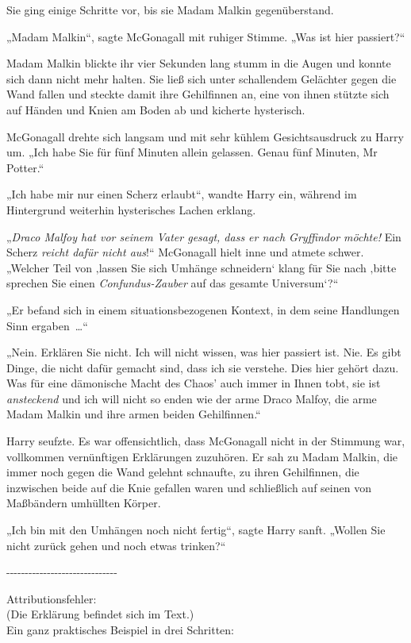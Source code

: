 {Sie ging einige Schritte vor, bis sie Madam Malkin gegenüberstand.

„Madam Malkin“, sagte McGonagall mit ruhiger Stimme. „Was ist hier passiert?“

Madam Malkin blickte ihr vier Sekunden lang stumm in die Augen und konnte sich dann nicht mehr halten. Sie ließ sich unter schallendem Gelächter gegen die Wand fallen und steckte damit ihre Gehilfinnen an, eine von ihnen stützte sich auf Händen und Knien am Boden ab und kicherte hysterisch.

McGonagall drehte sich langsam und mit sehr kühlem Gesichtsausdruck zu Harry um. „Ich habe Sie für fünf Minuten allein gelassen. Genau fünf Minuten, Mr Potter.“

„Ich habe mir nur einen Scherz erlaubt“, wandte Harry ein, während im Hintergrund weiterhin hysterisches Lachen erklang.

„\emph{Draco Malfoy hat vor seinem Vater gesagt, dass er nach Gryffindor möchte!} Ein Scherz \emph{reicht dafür nicht aus}!“ McGonagall hielt inne und atmete schwer. „Welcher Teil von ‚lassen Sie sich Umhänge schneidern` klang für Sie nach ‚bitte sprechen Sie einen \emph{Confundus-Zauber} auf das gesamte Universum`?“

„Er befand sich in einem situationsbezogenen Kontext, in dem seine Handlungen Sinn ergaben~…“

„Nein. Erklären Sie nicht. Ich will nicht wissen, was hier passiert ist. Nie. Es gibt Dinge, die nicht dafür gemacht sind, dass ich sie verstehe. Dies hier gehört dazu. Was für eine dämonische Macht des Chaos' auch immer in Ihnen tobt, sie ist \emph{ansteckend} und ich will nicht so enden wie der arme Draco Malfoy, die arme Madam Malkin und ihre armen beiden Gehilfinnen.“

Harry seufzte. Es war offensichtlich, dass McGonagall nicht in der Stimmung war, vollkommen vernünftigen Erklärungen zuzuhören. Er sah zu Madam Malkin, die immer noch gegen die Wand gelehnt schnaufte, zu ihren Gehilfinnen, die inzwischen beide auf die Knie gefallen waren und schließlich auf seinen von Maßbändern umhüllten Körper.

„Ich bin mit den Umhängen noch nicht fertig“, sagte Harry sanft. „Wollen Sie nicht zurück gehen und noch etwas trinken?“

-\/-\/-\/-\/-\/-\/-\/-\/-\/-\/-\/-\/-\/-\/-\/-\/-\/-\/-\/-\/-\/-\/-\/-\/-\/-\/-\/-\/-\/-

Attributionsfehler:\\ (Die Erklärung befindet sich im Text.)\\ Ein ganz praktisches Beispiel in drei Schritten:

}
